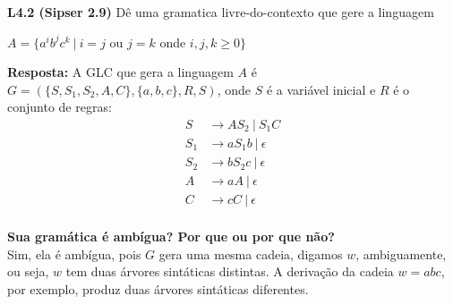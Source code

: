 
\noindent \textbf{L4.2 (Sipser 2.9)} Dê uma gramatica livre-do-contexto que gere a linguagem
\begin{center}
$A = \{a^ib^jc^k \ |\ i = j$ ou $j = k$ onde $i, j, k \geq 0\}$
\end{center}

\textbf{Resposta: } A GLC que gera a linguagem $A$ é $G = (\{S, S_1, S_2, A, C\}, \{a, b, c\}, R, S)$, onde $S$ é a variável inicial e $R$ é o conjunto de regras:
\begin{align*}
    S &\rightarrow AS_2 \ |\ S_1C \\
    S_1 &\rightarrow aS_1b \ |\ \epsilon \\
    S_2 &\rightarrow bS_2c \ |\ \epsilon \\
    A &\rightarrow aA \ |\ \epsilon \\
    C &\rightarrow cC \ |\ \epsilon \\
\end{align*}

\textbf{Sua gramática é ambígua? Por que ou por que não?}\\[3pt]
Sim, ela é ambígua, pois $G$ gera uma mesma cadeia, digamos $w$, ambiguamente, ou seja, $w$ tem duas árvores sintáticas distintas. A derivação da cadeia $w = abc$, por exemplo, produz duas árvores sintáticas diferentes.

\begin{figure}[H]
%
\centering
\end{figure}

